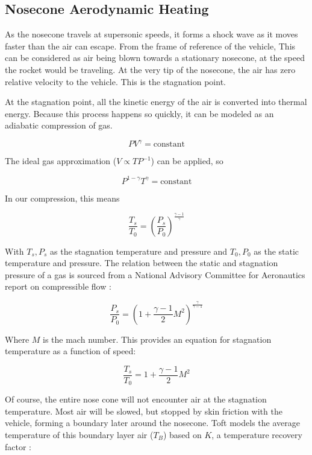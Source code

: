 \documentclass[twocolumn]{article}
\begin{document}
        \subsection{Nosecone Aerodynamic Heating}
            \label{sub:aeroeffect}
            As the nosecone travels at supersonic speeds, it forms a shock wave
            as it moves faster than the air can escape. From the frame of reference of the vehicle, 
            This can be considered as air being blown towards a stationary nosecone, at the
            speed the rocket would be traveling. At the very tip of
            the nosecone, the air has zero relative velocity to the vehicle. 
            This is the stagnation point. \cite{nasa:stagtemp}

            At the stagnation point, all the kinetic energy of the air is 
            converted into thermal energy. Because this process happens so
            quickly, it can be modeled as an adiabatic compression of gas.

            \[PV^\gamma = \textrm{constant}\]

            The ideal gas approximation ($V\propto TP^{-1}$) can be applied, so 

            \[P^{1-\gamma}T^\gamma=\textrm{constant}\]

            In our compression, this means 

            \[\frac{T_s}{T_0}=\left(\frac{P_s}{P_0}\right)^\frac{\gamma-1}{\gamma}\]

            With $T_s, P_s$ as the stagnation temperature and pressure and 
            $T_0, P_0$ as the static temperature and pressure. The relation 
            between the static and stagnation pressure of a gas is sourced from 
            a National Advisory Committee for Aeronautics report on compressible 
            flow \cite{naca:compressible}:

            \[\frac{P_s}{P_0} =\left(1+\frac{\gamma-1}{2}M^2\right)^{\frac{\gamma}{\gamma-1}}\]

            Where $M$ is the mach number. This provides an equation for
            stagnation temperature as a function of speed:

            \[\frac{T_s}{T_0}=1+\frac{\gamma-1}{2}M^2\]

            Of course, the entire nose cone will not encounter air at the
            stagnation temperature. Most air will be slowed, but stopped by skin 
            friction with the vehicle, forming a boundary later around the nosecone. 
            Toft models the average temperature of this boundary layer air ($T_B$) based on
            $K$, a temperature recovery factor \cite{Hans:Aero}:
\end{document}

